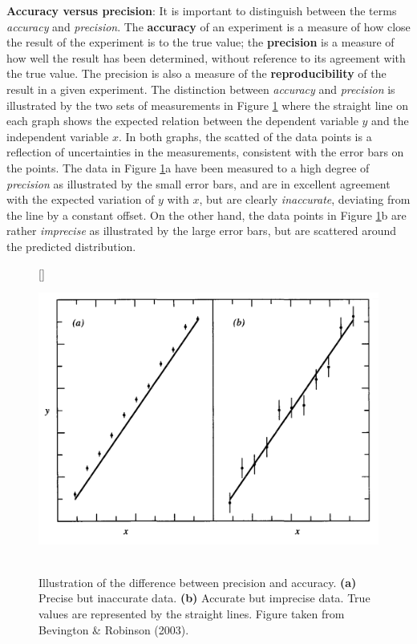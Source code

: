 \documentclass[a4paper,10pt]{article}
\begin{document}
\textbf{Accuracy versus precision}: It is important to distinguish between the terms \textit{accuracy} and \textit{precision}. The \textbf{accuracy} of an experiment is a measure of how close the result of the experiment is to the true value; the \textbf{precision} is a measure of how well the result has been determined, without reference to its agreement with the true value. The precision is also a measure of the \textbf{reproducibility} of the result in a given experiment. The distinction between \textit{accuracy} and \textit{precision} is illustrated by the two sets of measurements in Figure \ref{fig:precisionaccuracy} where the straight line on each graph shows the expected relation between the dependent variable $y$ and the independent variable $x$. In both graphs, the scatted of the data points is a reflection of uncertainties in the measurements, consistent with the error bars on the points. The data in Figure \ref{fig:precisionaccuracy}a have been measured to a high degree of \textit{precision} as illustrated by the small error bars, and are in excellent agreement with the expected variation of $y$ with $x$, but are clearly \textit{inaccurate}, deviating from the line by a constant offset. On the other hand, the data points in Figure \ref{fig:precisionaccuracy}b are rather \textit{imprecise} as illustrated by the large error bars, but are scattered around the predicted distribution.

\begin{figure}[h]
    [\FBwidth]
    {\caption{\footnotesize{\\Illustration of the difference between precision and accuracy. \textbf{(a)} Precise but inaccurate data. \textbf{(b)} Accurate but imprecise data. True values are represented by the straight lines. Figure taken from Bevington \& Robinson (2003).}}
    \label{fig:precisionaccuracy}}
    {\includegraphics[width=12cm]{figures/PrecisionAccuracy.png}}
\end{figure}
\end{document}
